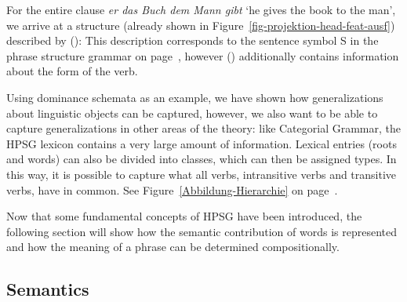 \noindent
For the entire clause \emph{er das Buch dem Mann gibt} `he gives the book to the man', we arrive at a structure (already shown in Figure~\ref{fig-projektion-head-feat-ausf}) 
described by ():
\ea
\label{HPSG-Rootnode}
\z
This description corresponds to the sentence symbol S in the phrase structure grammar on page~\pageref{bsp-grammatik-psg},
however () additionally contains information about the form of the verb.

Using dominance schemata as an example, we have shown how generalizations about linguistic objects
can be captured, however, we also want to be able to capture generalizations in other areas of the
theory: like Categorial Grammar\indexcxg, the HPSG lexicon contains a very large amount
of information. Lexical entries (roots and words) can also be divided into classes, which can then
be assigned types. In this way, it is possible to capture what all verbs, intransitive verbs and
transitive verbs, have in common. See Figure~\ref{Abbildung-Hierarchie} on
page~\pageref{Abbildung-Hierarchie}.

Now that some fundamental concepts of HPSG have been introduced, the following section will show how the semantic contribution of words is represented and
how the meaning of a phrase can be determined compositionally.

\subsection{Semantics}
\label{Abschnitt-HPSG-Semantik}

